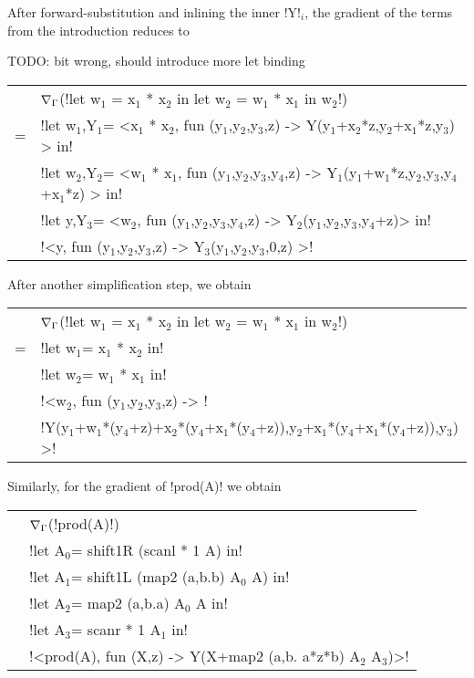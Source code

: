 \begin{example}
    After forward-substitution and inlining the inner !Y!$_{i}$, the gradient of the terms from the introduction reduces to

    TODO: bit wrong, should introduce more let binding
    \begin{tabular}{c l}
        & $\nabla_\Gamma$(!let w$_{1}$ = x$_{1}$ * x$_{2}$ in let w$_{2}$ = w$_{1}$ * x$_{1}$ in w$_{2}$!) \\
        =& !let w$_1$,Y$_1$= <x$_1$ * x$_{2}$, fun (y$_{1}$,y$_{2}$,y$_{3}$,z) -> Y(y$_{1}$+x$_2$*z,y$_{2}$+x$_1$*z,y$_{3}$) > in! \\
        & !let w$_{2}$,Y$_{2}$= <w$_{1}$ * x$_{1}$, fun (y$_{1}$,y$_{2}$,y$_{3}$,y$_{4}$,z) -> Y$_{1}$(y$_{1}$+w$_1$*z,y$_{2}$,y$_{3}$,y$_{4}$+x$_{1}$*z) > in! \\
        & !let y,Y$_{3}$= <w$_{2}$, fun (y$_{1}$,y$_{2}$,y$_{3}$,y$_{4}$,z) -> Y$_{2}$(y$_{1}$,y$_{2}$,y$_{3}$,y$_{4}$+z)> in! \\
        & !<y, fun (y$_{1}$,y$_{2}$,y$_{3}$,z) -> Y$_{3}$(y$_{1}$,y$_{2}$,y$_{3}$,0,z) >!
    \end{tabular}

After another simplification step, we obtain 

\begin{tabular}{c l}
    & $\nabla_\Gamma$(!let w$_{1}$ = x$_{1}$ * x$_{2}$ in let w$_{2}$ = w$_{1}$ * x$_{1}$ in w$_{2}$!) \\
    =& !let w$_1$= x$_1$ * x$_{2}$ in! \\
        & !let w$_{2}$= w$_{1}$ * x$_{1}$ in! \\
        & !<w$_{2}$, fun (y$_{1}$,y$_{2}$,y$_{3}$,z) -> !\\
        & \quad\quad\quad!Y(y$_{1}$+w$_1$*(y$_4$+z)+x$_2$*(y$_4$+x$_1$*(y$_4$+z)),y$_{2}$+x$_1$*(y$_4$+x$_1$*(y$_4$+z)),y$_{3}$) >!
\end{tabular}

Similarly, for the gradient of !prod(A)! we obtain

\begin{tabular}{c l}
        & $\nabla_\Gamma$(!prod(A)!) \\
        & !let A$_{0}$= shift1R (scanl * 1 A) in!\\
        & !let A$_{1}$= shift1L (map2 (a,b.b) A$_{0}$ A) in!\\
        & !let A$_{2}$= map2 (a,b.a) A$_{0}$ A in!\\
        & !let A$_{3}$= scanr * 1 A$_{1}$ in!\\
        & !<prod(A), fun (X,z) -> Y(X+map2 (a,b. a*z*b) A$_{2}$ A$_{3}$)>! 
    \end{tabular}
\end{example}

